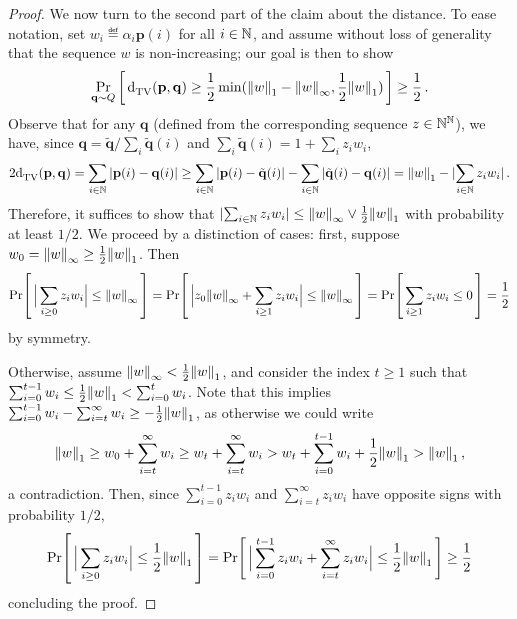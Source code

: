 \documentclass[10pt]{article}
\newcommand{\p}{\mathbf{p}}
\newcommand{\q}{\mathbf{q}}
\begin{document}
\begin{proof}
We now turn to the second part of the claim about the distance. To ease notation, set $w_i \eqdef \alpha_i\p(i)$ for all $i\in\mathbb{N}$, and assume without loss of generality that the sequence $w$ is non-increasing; our goal is then to show 
\[
    \probaDistrOf{\q\sim Q}{ \totalvardist{\p}{\q} \geq \frac{1}{2}\min( \normone{w} - \norminf{w}, \frac{1}{2}\normone{w}) } \geq \frac{1}{2}\,.
\] 
Observe that for any $\q$ (defined from the corresponding sequence $z\in\mathbb{N}^{\mathbb{N}}$), we have, since $\q = \tilde{\q}/\sum_i \tilde{\q}(i)$ and $\sum_i \tilde{\q}(i) = 1+\sum_{i} z_iw_i$,
\begin{equation}
    2\totalvardist{\p}{\q} = \sum_{i\in\N} \abs{ \p(i) - \q(i) } \geq \sum_{i\in\N} \abs{ \p(i) - \tilde{\q}(i) } - \sum_{i\in\N} \abs{ \tilde{\q}(i) - \q(i) }
    = \normone{w} - \dabs{\sum_{i\in\N} z_iw_i}\,.
\end{equation}
Therefore, it suffices to show that $\lvert \sum_{i\in\mathbb{N}} z_i w_i \rvert \leq {\lVert w{\rVert}}_\infty \lor \frac{1}{2}{\lVert w{\rVert}}_1$ with probability at least $1/2$. We proceed by a distinction of cases: first, suppose $w_0 = {\lVert w{\rVert}}_\infty \geq \frac{1}{2}{\lVert w{\rVert}}_1$. Then 
\[
    \Pr\!\left[\,  \Big| \sum_{i\geq 0} z_i w_i \Big| \leq {\lVert w{\rVert}}_\infty \, \right] = \Pr\!\left[\,  \Big| z_0{\lVert w{\rVert}}_\infty + \sum_{i\geq 1} z_i w_i \Big| \leq {\lVert w{\rVert}}_\infty \, \right] = 
    \Pr\!\left[\,  \sum_{i\geq 1} z_i w_i \leq 0 \, \right] = \frac{1}{2}
\]
by symmetry.

 Otherwise, assume ${\lVert w{\rVert}}_\infty < \frac{1}{2}{\lVert w{\rVert}}_1$, and consider the index $t\geq 1$ such that $\sum_{i=0}^{t-1} w_i \leq \frac{1}{2}{\lVert w{\rVert}}_1 < \sum_{i=0}^{t} w_i$. Note that this implies $\sum_{i=0}^{t-1} w_i-\sum_{i=t}^{\infty} w_i \geq -\frac{1}{2}{\lVert w{\rVert}}_1$, as otherwise we could write
 \[
    {\lVert w{\rVert}}_1 \geq w_0 + \sum_{i=t}^{\infty} w_i \geq w_t + \sum_{i=t}^{\infty} w_i > w_t + \sum_{i=0}^{t-1} w_i + \frac{1}{2}{\lVert w{\rVert}}_1 > {\lVert w{\rVert}}_1\,,
\]
 a contradiction. Then, since $\sum_{i=0}^{t-1} z_i w_i$ and $\sum_{i=t}^\infty z_i w_i$ have opposite signs with probability $1/2$,
 \[
    \Pr\!\left[\,  \Big| \sum_{i\geq 0} z_i w_i \Big| \leq \frac{1}{2}{\lVert w{\rVert}}_1 \, \right] = \Pr\!\left[\,  \Big| \sum_{i=0}^{t-1} z_i w_i + \sum_{i=t}^\infty z_i w_i \Big| \leq \frac{1}{2}{\lVert w{\rVert}}_1 \, \right] \geq \frac{1}{2}
\]
concluding the proof.
\end{proof}
\end{document}
